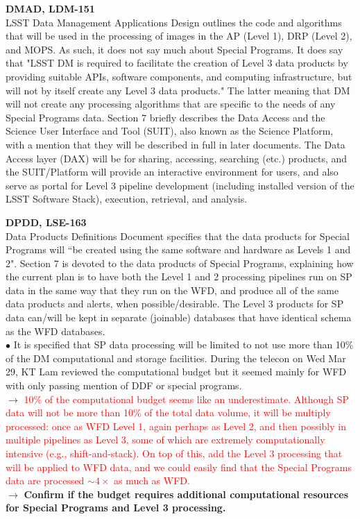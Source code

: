 \documentclass[DM,lsstdraft,toc]{lsstdoc}
\begin{document}
\noindent \textbf{DMAD, LDM-151}\\
LSST Data Management Applications Design \citep{LDM-151} outlines the code and algorithms that will be used in the processing of images in the AP (Level 1), DRP (Level 2), and MOPS. As such, it does not say much about Special Programs. It does say that "LSST DM is required to facilitate the creation of Level 3 data products by providing suitable APIs, software components, and computing infrastructure, but will not by itself create any Level 3 data products." The latter meaning that DM will not create any processing algorithms that are specific to the needs of any Special Programs data. Section 7 briefly describes the Data Access and the Science User Interface and Tool (SUIT), also known as the Science Platform, with a mention that they will be described in full in later documents. The Data Access layer (DAX) will be for sharing, accessing, searching (etc.) products, and the SUIT/Platform will provide an interactive environment for users, and also serve as portal for Level 3 pipeline development (including installed version of the LSST Software Stack), execution, retrieval, and analysis.

\noindent \textbf{DPDD, LSE-163}\\
Data Products Definitions Document \citep{LSE-163} specifies that the data products for Special Programs will ``be created using the same software and hardware as Levels 1 and 2". Section 7 is devoted to the data products of Special Programs, explaining how the current plan is to have both the Level 1 and 2 processing pipelines run on SP data in the same way that they run on the WFD, and produce all of the same data products and alerts, when possible/desirable. The Level 3 products for SP data can/will be kept in separate (joinable) databases that have identical schema as the WFD databases. \\
$\bullet$ It is specified that SP data processing will be limited to not use more than 10\% of the DM computational and storage facilities. During the telecon on Wed Mar 29, KT Lam reviewed the computational budget but it seemed mainly for WFD with only passing mention of DDF or special programs. \\
$\rightarrow$ \textcolor{red}{10\% of the computational budget seems like an underestimate. Although SP data will not be more than 10\% of the total data volume, it will be multiply processed: once as WFD Level 1, again perhaps as Level 2, and then possibly in multiple pipelines as Level 3, some of which are extremely computationally intensive (e.g., shift-and-stack). On top of this, add the Level 3 processing that will be applied to WFD data, and we could easily find that the Special Programs data are processed $\sim4\times$ as much as WFD.} \\
$\rightarrow$ \textbf{Confirm if the budget requires additional computational resources for Special Programs and Level 3 processing.}
\end{document}
